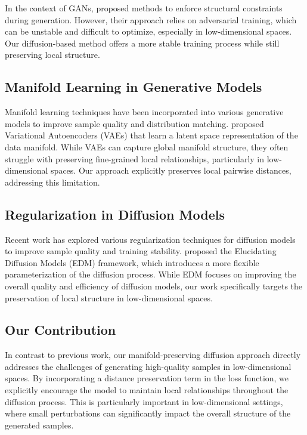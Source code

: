 \documentclass{article} %
\begin{document}
In the context of GANs, \citet{gan} proposed methods to enforce structural constraints during generation. However, their approach relies on adversarial training, which can be unstable and difficult to optimize, especially in low-dimensional spaces. Our diffusion-based method offers a more stable training process while still preserving local structure.

\subsection{Manifold Learning in Generative Models}

Manifold learning techniques have been incorporated into various generative models to improve sample quality and distribution matching. \citet{vae} proposed Variational Autoencoders (VAEs) that learn a latent space representation of the data manifold. While VAEs can capture global manifold structure, they often struggle with preserving fine-grained local relationships, particularly in low-dimensional spaces. Our approach explicitly preserves local pairwise distances, addressing this limitation.

\subsection{Regularization in Diffusion Models}

Recent work has explored various regularization techniques for diffusion models to improve sample quality and training stability. \citet{edm} proposed the Elucidating Diffusion Models (EDM) framework, which introduces a more flexible parameterization of the diffusion process. While EDM focuses on improving the overall quality and efficiency of diffusion models, our work specifically targets the preservation of local structure in low-dimensional spaces.

\subsection{Our Contribution}

In contrast to previous work, our manifold-preserving diffusion approach directly addresses the challenges of generating high-quality samples in low-dimensional spaces. By incorporating a distance preservation term in the loss function, we explicitly encourage the model to maintain local relationships throughout the diffusion process. This is particularly important in low-dimensional settings, where small perturbations can significantly impact the overall structure of the generated samples.
\end{document}
